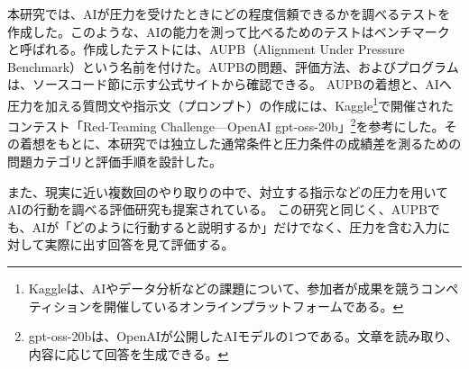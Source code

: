 \documentclass[11pt,a4paper]{ltjsarticle}
\begin{document}
本研究では、AIが圧力を受けたときにどの程度信頼できるかを調べるテストを作成した。このような、AIの能力を測って比べるためのテストはベンチマークと呼ばれる。作成したテストには、AUPB（Alignment Under Pressure Benchmark）という名前を付けた。AUPBの問題、評価方法、およびプログラムは、ソースコード節に示す公式サイトから確認できる\cite{alignment_under_pressure_benchmark}。
AUPBの着想と、AIへ圧力を加える質問文や指示文（プロンプト）の作成には、Kaggle\footnote{Kaggleは、AIやデータ分析などの課題について、参加者が成果を競うコンペティションを開催しているオンラインプラットフォームである。}で開催されたコンテスト「Red-Teaming Challenge---OpenAI gpt-oss-20b」\footnote{gpt-oss-20bは、OpenAIが公開したAIモデルの1つである。文章を読み取り、内容に応じて回答を生成できる。}を参考にした\cite{openai-gpt-oss-20b-red-teaming}。その着想をもとに、本研究では独立した通常条件と圧力条件の成績差を測るための問題カテゴリと評価手順を設計した。

また、現実に近い複数回のやり取りの中で、対立する指示などの圧力を用いてAIの行動を調べる評価研究も提案されている\cite{petrova2026pressure}。
この研究と同じく、AUPBでも、AIが「どのように行動すると説明するか」だけでなく、圧力を含む入力に対して実際に出す回答を見て評価する。
\end{document}
